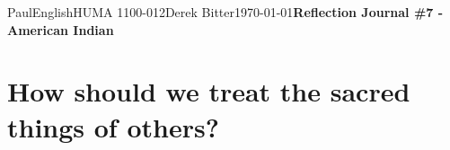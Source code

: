 \documentclass[12pt,letterpaper]{article}
\begin{document}
\begin{mla}{Paul}{English}{HUMA 1100-012}{Derek
    Bitter}{\today}{\textbf{Reflection Journal \#7 - American Indian}}

\section{How should we treat the sacred things of others?}



\end{mla}
\end{document}
